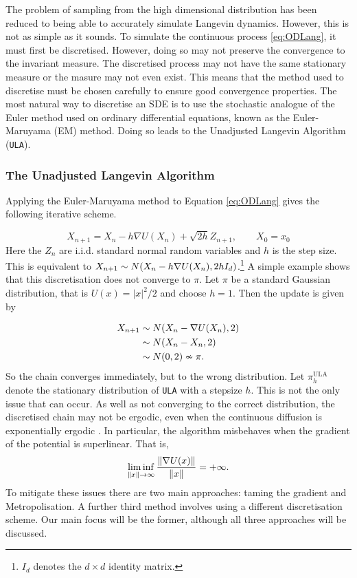 The problem of sampling from the high dimensional distribution has been reduced to being able to accurately simulate Langevin dynamics. However, this is not as simple as it sounds. To simulate the continuous process  \eqref{eq:ODLang}, it must first be discretised. However, doing so may not preserve the convergence to the invariant measure. The discretised process may not have the same stationary measure or the masure may not even exist. This means that the method used to discretise must be chosen carefully to ensure good convergence properties. The most natural way to discretise an SDE is to use the stochastic analogue of the Euler method used on ordinary differential equations, known as the Euler-Maruyama (EM) method. Doing so leads to the Unadjusted Langevin Algorithm (\texttt{ULA}).

\subsubsection{The Unadjusted Langevin Algorithm}
Applying the Euler-Maruyama method to Equation \eqref{eq:ODLang} gives the following iterative scheme.

\[X_{n+1} = X_n -h \nabla U(X_n) +\sqrt{2h} Z_{n+1},\qquad X_0= x_0 \]
Here the \(Z_n \) are i.i.d. standard normal random variables and \(h\) is the step size. This is equivalent to \(X_{n+1} \sim N(X_n - h\nabla U(X_n), 2h I_d )\).\footnote{\(I_d\) denotes the \(d \times d\) identity matrix.} A simple example shows that this discretisation does not converge to \(\pi\). Let \(\pi\) be a standard Gaussian distribution, that is \(U(x) = |x|^2/2 \) and choose \(h = 1\). Then the update is given by 

\begin{align*}
	X_{n+1} &\sim N(X_n - \nabla U(X_n), 2)\\
	& \sim  N(X_n - X_n, 2)\\
	& \sim N(0,2) \nsim \pi .
\end{align*}
So the chain converges immediately, but to the wrong distribution. Let \(\pi^{\text{ULA}}_{h} \) denote the stationary distribution of \texttt{ULA} with a stepsize \(h\). This is not the only issue that can occur. As well as not converging to the correct distribution, the discretised chain may not be  ergodic, even when the continuous diffusion is exponentially ergodic \cite{RT96}. In particular, the algorithm misbehaves when the gradient of the potential is superlinear. That is,
\[\liminf_{\|x\|\to \infty} \frac{\|\nabla U(x)\|}{\|x\|} = +\infty. \]
To mitigate these issues there are two main approaches: taming the gradient and Metropolisation. A further third method involves using a different discretisation scheme.  Our main focus will be the former, although all three approaches will be discussed. 

